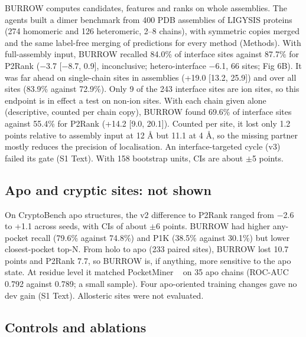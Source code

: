 \documentclass[10pt,letterpaper]{article}
\begin{document}
BURROW computes candidates, features and ranks on whole assemblies. The agents built a dimer benchmark from 400 PDB assemblies of LIGYSIS proteins (274 homomeric and 126 heteromeric, 2--8 chains), with symmetric copies merged and the same label-free merging of predictions for every method (Methods). With full-assembly input, BURROW recalled 84.0\% of interface sites against 87.7\% for P2Rank ($-$3.7 [$-$8.7, 0.9], inconclusive; hetero-interface $-$6.1, 66 sites; Fig 6B). It was far ahead on single-chain sites in assemblies (+19.0 [13.2, 25.9]) and over all sites (83.9\% against 72.9\%). Only 9 of the 243 interface sites are ion sites, so this endpoint is in effect a test on non-ion sites. With each chain given alone (descriptive, counted per chain copy), BURROW found 69.6\% of interface sites against 55.4\% for P2Rank (+14.2 [9.0, 20.1]). Counted per site, it lost only 1.2 points relative to assembly input at 12 \AA{} but 11.1 at 4 \AA{}, so the missing partner mostly reduces the precision of localisation. An interface-targeted cycle (v3) failed its gate (S1 Text). With 158 bootstrap units, CIs are about $\pm$5 points.

\subsection*{Apo and cryptic sites: not shown}

On CryptoBench apo structures, the v2 difference to P2Rank ranged from $-$2.6 to +1.1 across seeds, with CIs of about $\pm$6 points. BURROW had higher any-pocket recall (79.6\% against 74.8\%) and P1K (38.5\% against 30.1\%) but lower closest-pocket top-N. From holo to apo (233 paired sites), BURROW lost 10.7 points and P2Rank 7.7, so BURROW is, if anything, more sensitive to the apo state. At residue level it matched PocketMiner ~\cite{meller2023} on 35 apo chains (ROC-AUC 0.792 against 0.789; a small sample). Four apo-oriented training changes gave no dev gain (S1 Text). Allosteric sites were not evaluated.

\subsection*{Controls and ablations}
\end{document}
